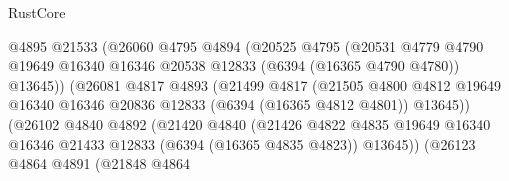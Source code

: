 \begin{lexlean}{RustCore}
\begin{coremodule}
                                    @4895
                                    @21533
                                    (@26060
                                      @4795
                                      @4894
                                      (@20525
                                        @4795
                                        (@20531
                                          @4779
                                          @4790
                                          @19649
                                          @16340
                                          @16346
                                          @20538
                                          @12833
                                          (@6394 (@16365 @4790 @4780))
                                          @13645))
                                      (@26081
                                        @4817
                                        @4893
                                        (@21499
                                          @4817
                                          (@21505
                                            @4800
                                            @4812
                                            @19649
                                            @16340
                                            @16346
                                            @20836
                                            @12833
                                            (@6394 (@16365 @4812 @4801))
                                            @13645))
                                        (@26102
                                          @4840
                                          @4892
                                          (@21420
                                            @4840
                                            (@21426
                                              @4822
                                              @4835
                                              @19649
                                              @16340
                                              @16346
                                              @21433
                                              @12833
                                              (@6394 (@16365 @4835 @4823))
                                              @13645))
                                          (@26123
                                            @4864
                                            @4891
                                            (@21848
                                              @4864

\end{coremodule}
\end{lexlean}
